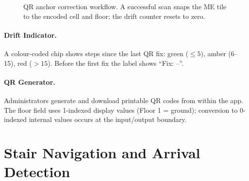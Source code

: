 \documentclass[12pt,a4paper]{article}
\begin{document}
\begin{figure}[H]
\centering
{}
\caption{QR anchor correction workflow. A successful scan snaps the ME tile to
the encoded cell and floor; the drift counter resets to zero.}
\label{fig:qr}
\end{figure}

\paragraph{Drift Indicator.}
A colour-coded chip shows steps since the last QR fix: green (${\leq}5$),
amber (6--15), red ($>15$). Before the first fix the label shows ``Fix: --''.

\paragraph{QR Generator.}
Administrators generate and download printable QR codes from within the app.
The floor field uses 1-indexed display values (Floor 1 = ground); conversion to
0-indexed internal values occurs at the input/output boundary.

\section{Stair Navigation and Arrival Detection}
\label{sec:stair}
\end{document}
